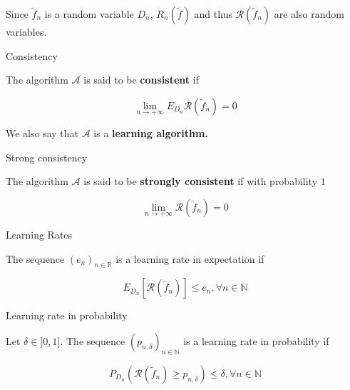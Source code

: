 \documentclass[
10pt, %
a4paper, %
oneside, %
headinclude,footinclude, %
BCOR5mm, %
]{scrartcl}
\begin{document}
\begin{remark}
Since $ \tilde{f}_n$ is a random variable $D_n$, $R_n( \tilde{f})$ and thus $ \mathcal{R} ( \tilde{f}_n)$ are also random variables.
\end{remark}


\begin{definition}{Consistency}

    The algorithm $\mathcal{A} $ is said to be \textbf{{consistent}}  if 

    \begin{equation*}
	\lim_{n\rightarrow +\infty} E_{D_n} \mathcal{R} ( \tilde{f}_n)=0 
    \end{equation*}
\end{definition}

    We also say that $ \mathcal{A} $ is a \textbf{{learning algorithm.}} 

\begin{definition}{Strong consistency}

    The algorithm $\mathcal{A} $ is said to be \textbf{{strongly consistent}}  if with probability $1$

    \begin{equation*}
	\lim_{n\rightarrow +\infty} \mathcal{R} ( \tilde{f}_n)=0 
    \end{equation*}


\end{definition}

\begin{definition}{Learning Rates}

    The sequence $(e_n)_{n \in \mathbb{R} } $ is a learning rate in expectation if

    \begin{equation*}
	E_{D_n} [\mathcal{R} ( \tilde{f}_n)]\leq e_n, \forall n\in \mathbb{N} 
    \end{equation*}
    
\end{definition}

\begin{definition}{Learning rate in probability}

    Let $\delta \in ]0, 1]$.  The  sequence $(p_{n, \delta})_{n\in \mathbb{N} }$ is a learning rate in probability if

    \begin{equation*}
	P_{D_n}( \mathcal{R} ( \tilde{f}_n)\geq p_{n,\delta})\leq \delta, \forall n\in \mathbb{N} 
    \end{equation*}
\end{definition}
\end{document}
